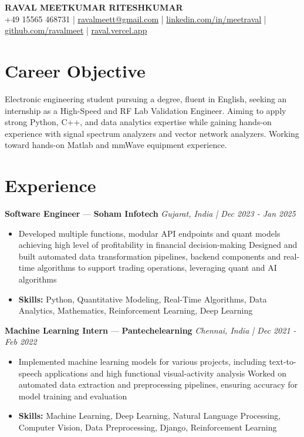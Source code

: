 \documentclass[a4paper,10pt]{article}
\begin{document}
\begin{center}
  {\Large\bfseries RAVAL MEETKUMAR RITESHKUMAR}\\[2pt]
  {\small +49 15565 468731 \;|\; \href{mailto:ravalmeett@gmail.com}{ravalmeett@gmail.com} \;|\; \href{https://www.linkedin.com/in/meetraval/}{linkedin.com/in/meetraval} \;|\; \href{https://github.com/ravalmeet}{github.com/ravalmeet} \;|\; \href{https://raval.vercel.app/}{raval.vercel.app}}
\end{center}
\vspace{-3pt}

\section*{Career Objective}
Electronic engineering student pursuing a degree, fluent in English, seeking an internship as a High-Speed and RF Lab Validation Engineer. Aiming to apply strong Python, C++, and data analytics expertise while gaining hands-on experience with signal spectrum analyzers and vector network analyzers. Working toward hands-on Matlab and mmWave equipment experience.\par

\section*{Experience}
\textbf{Software Engineer} — \textbf{Soham Infotech} \hfill \textit{Gujarat, India \;|\; Dec 2023 - Jan 2025}\par
\vspace{1pt}
\begin{itemize}
  \item Developed multiple functions, modular API endpoints and quant models achieving high level of profitability in financial decision-making Designed and built automated data transformation pipelines, backend components and real-time algorithms to support trading operations, leveraging quant and AI algorithms
  \item \textbf{Skills:} Python, Quantitative Modeling, Real-Time Algorithms, Data Analytics, Mathematics, Reinforcement Learning, Deep Learning
\end{itemize}
\vspace{3pt}
\textbf{Machine Learning Intern} — \textbf{Pantechelearning} \hfill \textit{Chennai, India \;|\; Dec 2021 - Feb 2022}\par
\vspace{1pt}
\begin{itemize}
  \item Implemented machine learning models for various projects, including text-to-speech applications and high functional visual-activity analysis Worked on automated data extraction and preprocessing pipelines, ensuring accuracy for model training and evaluation
  \item \textbf{Skills:} Machine Learning, Deep Learning, Natural Language Processing, Computer Vision, Data Preprocessing, Django, Reinforcement Learning
\end{itemize}
\end{document}
